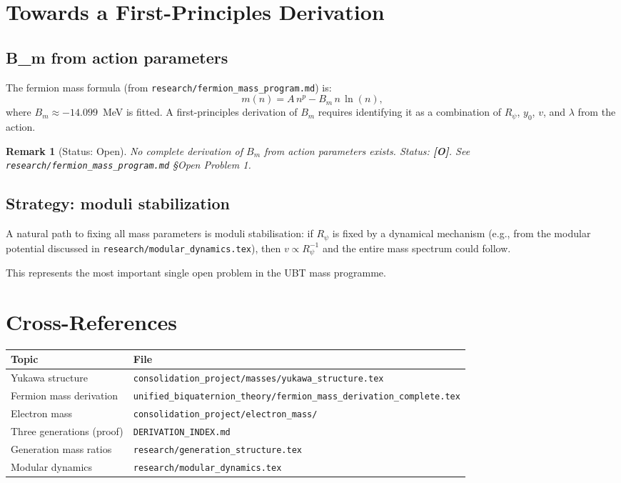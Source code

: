\documentclass[11pt,a4paper]{article}
\newtheorem{remark}{Remark}
\begin{document}
\section{Towards a First-Principles Derivation}
\label{sec:first_principles}

\subsection{B\_m from action parameters}

The fermion mass formula (from \texttt{research/fermion\_mass\_program.md}) is:
\begin{equation}
  m(n) = A\, n^p - B_m\, n\,\ln(n),
\end{equation}
where $B_m \approx -14.099$~MeV is fitted.  A first-principles derivation
of $B_m$ requires identifying it as a combination of $R_\psi$, $y_0$, $v$,
and $\lambda$ from the action.

\begin{remark}[Status: Open]
  No complete derivation of $B_m$ from action parameters exists.
  Status: \textbf{[O]}.  See \texttt{research/fermion\_mass\_program.md}
  §Open Problem 1.
\end{remark}

\subsection{Strategy: moduli stabilization}

A natural path to fixing all mass parameters is moduli stabilisation:
if $R_\psi$ is fixed by a dynamical mechanism (e.g., from the modular
potential discussed in \texttt{research/modular\_dynamics.tex}), then
$v \propto R_\psi^{-1}$ and the entire mass spectrum could follow.

This represents the most important single open problem in the UBT mass
programme.

\section{Cross-References}
\label{sec:xref}

\begin{tabular}{ll}
\hline
Topic & File \\
\hline
Yukawa structure & \texttt{consolidation\_project/masses/yukawa\_structure.tex} \\
Fermion mass derivation & \texttt{unified\_biquaternion\_theory/fermion\_mass\_derivation\_complete.tex} \\
Electron mass & \texttt{consolidation\_project/electron\_mass/} \\
Three generations (proof) & \texttt{DERIVATION\_INDEX.md} \\
Generation mass ratios & \texttt{research/generation\_structure.tex} \\
Modular dynamics & \texttt{research/modular\_dynamics.tex} \\
\hline
\end{tabular}
\end{document}
